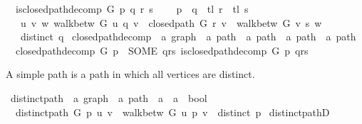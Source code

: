\begin{isabellebody}
\ \ {\isachardoublequoteopen}is{\isacharunderscore}{\kern0pt}closed{\isacharunderscore}{\kern0pt}path{\isacharunderscore}{\kern0pt}decomp\ G\ p\ {\isacharparenleft}{\kern0pt}q{\isacharcomma}{\kern0pt}\ r{\isacharcomma}{\kern0pt}\ s{\isacharparenright}{\kern0pt}\ {\isasymlongleftrightarrow}\isanewline
\ \ \ p\ {\isacharequal}{\kern0pt}\ q\ {\isacharat}{\kern0pt}\ tl\ r\ {\isacharat}{\kern0pt}\ tl\ s\ {\isasymand}\isanewline
\ \ \ {\isacharparenleft}{\kern0pt}{\isasymexists}u\ v\ w{\isachardot}{\kern0pt}\ walk{\isacharunderscore}{\kern0pt}betw\ G\ u\ q\ v\ {\isasymand}\ closed{\isacharunderscore}{\kern0pt}path\ G\ r\ v\ {\isasymand}\ walk{\isacharunderscore}{\kern0pt}betw\ G\ v\ s\ w{\isacharparenright}{\kern0pt}\ {\isasymand}\isanewline
\ \ \ distinct\ q{\isachardoublequoteclose}\isanewline
\isanewline
{}\isamarkupfalse%
\ closed{\isacharunderscore}{\kern0pt}path{\isacharunderscore}{\kern0pt}decomp\ {\isacharcolon}{\kern0pt}{\isacharcolon}{\kern0pt}\ {\isachardoublequoteopen}{\isacharprime}{\kern0pt}a\ graph\ {\isasymRightarrow}\ {\isacharprime}{\kern0pt}a\ path\ {\isasymRightarrow}\ {\isacharprime}{\kern0pt}a\ path\ {\isasymtimes}\ {\isacharprime}{\kern0pt}a\ path\ {\isasymtimes}\ {\isacharprime}{\kern0pt}a\ path{\isachardoublequoteclose}\ \isanewline
\ \ {\isachardoublequoteopen}closed{\isacharunderscore}{\kern0pt}path{\isacharunderscore}{\kern0pt}decomp\ G\ p\ {\isasymequiv}\ SOME\ qrs{\isachardot}{\kern0pt}\ is{\isacharunderscore}{\kern0pt}closed{\isacharunderscore}{\kern0pt}path{\isacharunderscore}{\kern0pt}decomp\ G\ p\ qrs{\isachardoublequoteclose}%
\begin{isamarkuptext}%
A simple path is a path in which all vertices are distinct.%
\end{isamarkuptext}\isamarkuptrue%
\isamarkupfalse%
\ distinct{\isacharunderscore}{\kern0pt}path\ {\isacharcolon}{\kern0pt}{\isacharcolon}{\kern0pt}\ {\isachardoublequoteopen}{\isacharprime}{\kern0pt}a\ graph\ {\isasymRightarrow}\ {\isacharprime}{\kern0pt}a\ path\ {\isasymRightarrow}\ {\isacharprime}{\kern0pt}a\ {\isasymRightarrow}\ {\isacharprime}{\kern0pt}a\ {\isasymRightarrow}\ bool{\isachardoublequoteclose}\ \isanewline
\ \ {\isachardoublequoteopen}distinct{\isacharunderscore}{\kern0pt}path\ G\ p\ u\ v\ {\isasymequiv}\ walk{\isacharunderscore}{\kern0pt}betw\ G\ u\ p\ v\ {\isasymand}\ distinct\ p{\isachardoublequoteclose}\isanewline
%
\isadeliminvisible
\isanewline
%
\endisadeliminvisible
%
\isataginvisible
{}\isamarkupfalse%
\ distinct{\isacharunderscore}{\kern0pt}pathD{\isacharcolon}{\kern0pt}\isanewline

\end{isabellebody}
